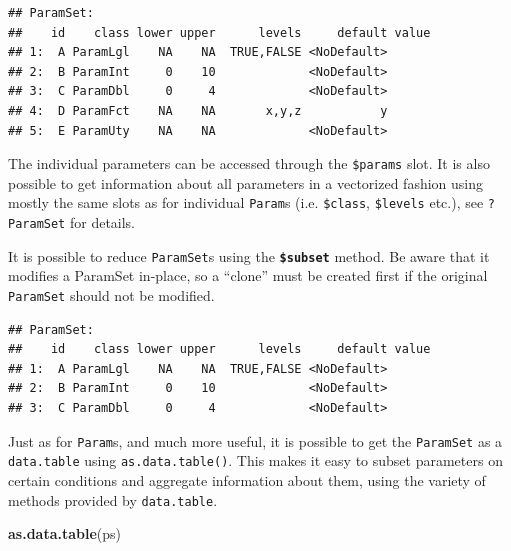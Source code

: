 \documentclass[]{scrbook}
\newenvironment{Shaded}{\begin{snugshade}}{\end{snugshade}}
\newcommand{\KeywordTok}[1]{\textcolor[rgb]{0.13,0.29,0.53}{\textbf{#1}}}
\newcommand{\NormalTok}[1]{#1}
\newcommand{\OperatorTok}[1]{\textcolor[rgb]{0.81,0.36,0.00}{\textbf{#1}}}
\newcommand{\StringTok}[1]{\textcolor[rgb]{0.31,0.60,0.02}{#1}}
\renewenvironment{Shaded} {\begin{snugshade}\small} {\end{snugshade}}
\begin{document}
\begin{verbatim}
## ParamSet: 
##    id    class lower upper      levels     default value
## 1:  A ParamLgl    NA    NA  TRUE,FALSE <NoDefault>      
## 2:  B ParamInt     0    10             <NoDefault>      
## 3:  C ParamDbl     0     4             <NoDefault>      
## 4:  D ParamFct    NA    NA       x,y,z           y      
## 5:  E ParamUty    NA    NA             <NoDefault>
\end{verbatim}

The individual parameters can be accessed through the \texttt{\$params} slot.
It is also possible to get information about all parameters in a vectorized fashion using mostly the same slots as for individual \texttt{Param}s (i.e. \texttt{\$class}, \texttt{\$levels} etc.), see \texttt{?ParamSet} for details.

It is possible to reduce \texttt{ParamSet}s using the \textbf{\texttt{\$subset}} method.
Be aware that it modifies a ParamSet in-place, so a ``clone'' must be created first if the original \texttt{ParamSet} should not be modified.

\begin{Shaded}
\end{Shaded}

\begin{verbatim}
## ParamSet: 
##    id    class lower upper      levels     default value
## 1:  A ParamLgl    NA    NA  TRUE,FALSE <NoDefault>      
## 2:  B ParamInt     0    10             <NoDefault>      
## 3:  C ParamDbl     0     4             <NoDefault>
\end{verbatim}

Just as for \texttt{Param}s, and much more useful, it is possible to get the \texttt{ParamSet} as a \texttt{data.table} using \texttt{as.data.table()}.
This makes it easy to subset parameters on certain conditions and aggregate information about them, using the variety of methods provided by \texttt{data.table}.

\begin{Shaded}
\begin{Highlighting}[]
\KeywordTok{as.data.table}\NormalTok{(ps)}
\end{Highlighting}
\end{Shaded}
\end{document}
